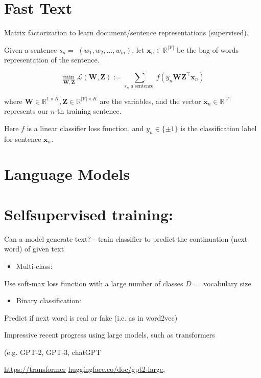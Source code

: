 \documentclass[10pt]{article}
\begin{document}
\section*{Fast Text}
Matrix factorization to learn document/sentence representations (supervised).

Given a sentence $s_{n}=$ $\left(w_{1}, w_{2}, \ldots, w_{m}\right)$, let $\mathbf{x}_{n} \in \mathbb{R}^{|\mathcal{V}|}$ be the bag-of-words representation of the sentence.

$$
\min _{\mathbf{W}, \mathbf{Z}} \mathcal{L}(\mathbf{W}, \mathbf{Z}):=\sum_{s_{n} \text { a sentence }} f\left(y_{n} \mathbf{W} \mathbf{Z}^{\top} \mathbf{x}_{n}\right)
$$

where $\mathbf{W} \in \mathbb{R}^{1 \times K}, \mathbf{Z} \in \mathbb{R}^{|\mathcal{V}| \times K}$ are the variables, and the vector $\mathbf{x}_{n} \in \mathbb{R}^{|\mathcal{V}|}$ represents our $n$-th training sentence.

Here $f$ is a linear classifier loss function, and $y_{n} \in\{ \pm 1\}$ is the classification label for sentence $\mathbf{x}_{n}$.

\section*{Language Models}
\section*{Selfsupervised training:}
Can a model generate text? - train classifier to predict the continuation (next word) of given text

\begin{itemize}
  \item Multi-class:
\end{itemize}

Use soft-max loss function with a large number of classes $D=$ vocabulary size

\begin{itemize}
  \item Binary classification:
\end{itemize}

Predict if next word is real or fake (i.e. as in word2vec)

Impressive recent progress using large models, such as transformers

(e.g. GPT-2, GPT-3, chatGPT

\href{https://transformer}{https://transformer} \href{http://huggingface.co/doc/gpt2-large}{huggingface.co/doc/gpt2-large},
\end{document}
